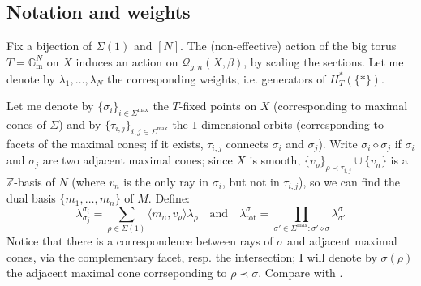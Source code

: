 \documentclass[11pt]{amsart}
\newcommand{\Q}[4]{\mathcal{Q}_{#1,#2}(#3,#4)}
\newcommand{\Gm}{\mathbb{G}_{\text{m}}}
\newcommand{\ZZ}{\mathbb{Z}}
\theoremstyle{definition}
\theoremstyle{definition}
\begin{document}
\subsection{Notation and weights} Fix a bijection of $\Sigma(1)$ and $[N]$. The (non-effective) action of the big torus $T=\Gm^N$ on $X$ induces an action on $\Q{g}{n}{X}{\beta}$, by scaling the sections. Let me denote by $\lambda_1,\ldots,\lambda_N$ the corresponding weights, i.e. generators of $H^*_T(\{*\})$.

Let me denote by $\{\sigma_i\}_{i\in\Sigma^\text{max}}$ the $T$-fixed points on $X$ (corresponding to maximal cones of $\Sigma$) and by $\{\tau_{i,j}\}_{i,j\in\Sigma^\text{max}}$ the $1$-dimensional orbits (corresponding to facets of the maximal cones; if it exists, $\tau_{i,j}$ connects $\sigma_i$ and $\sigma_j$).
Write $\sigma_i\diamond\sigma_j$ if $\sigma_i$ and $\sigma_j$ are two adjacent maximal cones; since $X$ is smooth, $\{v_\rho\}_{\rho\prec\tau_{i,j}}\cup\{v_n\}$ is a $\ZZ$-basis of $N$ (where $v_n$ is the only ray in $\sigma_i$, but not in $\tau_{i,j}$), so we can find the dual basis $\{m_1,\ldots,m_n\}$ of $M$. Define: \[\lambda^{\sigma_i}_{\sigma_j}=\sum_{\rho\in\Sigma(1)}\langle m_n,v_\rho\rangle\lambda_\rho \quad \text{and} \quad \lambda^{\sigma}_{\text{tot}}=\prod_{\sigma'\in\Sigma^{\text{max}}\colon\sigma'\diamond\sigma}\lambda^\sigma_{\sigma'}\] Notice that there is a correspondence between rays of $\sigma$ and adjacent maximal cones, via the complementary facet, resp. the intersection; I will denote by $\sigma(\rho)$ the adjacent maximal cone corrseponding to $\rho\prec\sigma$. Compare with \cite[\S\S 6.4 and 7.3]{HolgerSpielberg}.
\end{document}

